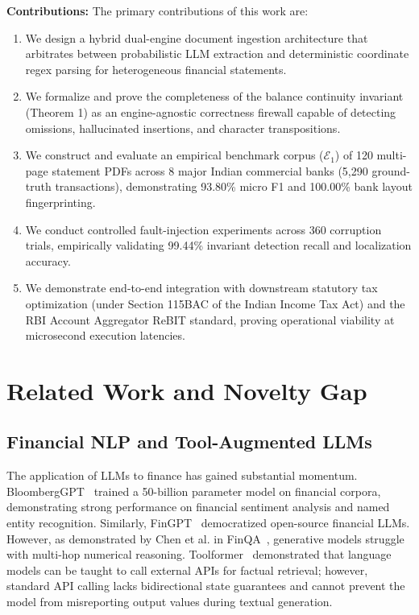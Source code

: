 \documentclass[conference]{IEEEtran}
\begin{document}
\textbf{Contributions:} The primary contributions of this work are:
\begin{enumerate}
    \item We design a hybrid dual-engine document ingestion architecture that arbitrates between probabilistic LLM extraction and deterministic coordinate regex parsing for heterogeneous financial statements.
    \item We formalize and prove the completeness of the balance continuity invariant (Theorem 1) as an engine-agnostic correctness firewall capable of detecting omissions, hallucinated insertions, and character transpositions.
    \item We construct and evaluate an empirical benchmark corpus ($\mathcal{E}_1$) of 120 multi-page statement PDFs across 8 major Indian commercial banks (5,290 ground-truth transactions), demonstrating 93.80\% micro F1 and 100.00\% bank layout fingerprinting.
    \item We conduct controlled fault-injection experiments across 360 corruption trials, empirically validating 99.44\% invariant detection recall and localization accuracy.
    \item We demonstrate end-to-end integration with downstream statutory tax optimization (under Section 115BAC of the Indian Income Tax Act) and the RBI Account Aggregator ReBIT standard, proving operational viability at microsecond execution latencies.
\end{enumerate}

\section{Related Work and Novelty Gap}
\subsection{Financial NLP and Tool-Augmented LLMs}
The application of LLMs to finance has gained substantial momentum. BloombergGPT~\cite{wu2023bloomberggpt} trained a 50-billion parameter model on financial corpora, demonstrating strong performance on financial sentiment analysis and named entity recognition. Similarly, FinGPT~\cite{yang2023fingpt} democratized open-source financial LLMs. However, as demonstrated by Chen et al. in FinQA~\cite{chen2021finqa}, generative models struggle with multi-hop numerical reasoning. Toolformer~\cite{schick2024toolformer} demonstrated that language models can be taught to call external APIs for factual retrieval; however, standard API calling lacks bidirectional state guarantees and cannot prevent the model from misreporting output values during textual generation.
\end{document}
